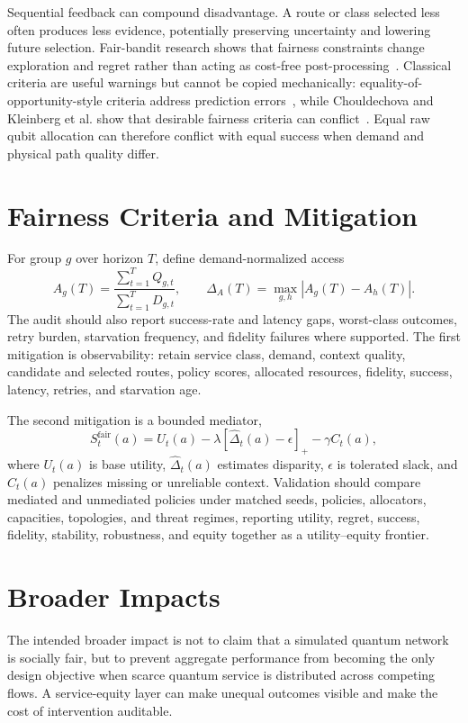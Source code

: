 \documentclass[10pt,conference]{IEEEtran}
\begin{document}
Sequential feedback can compound disadvantage. A route or class selected less often produces less evidence, potentially preserving uncertainty and lowering future selection. Fair-bandit research shows that fairness constraints change exploration and regret rather than acting as cost-free post-processing~\cite{joseph2016fairness,chen2020faircmab}. Classical criteria are useful warnings but cannot be copied mechanically: equality-of-opportunity-style criteria address prediction errors~\cite{hardt2016equality}, while Chouldechova and Kleinberg et al. show that desirable fairness criteria can conflict~\cite{chouldechova2017fair,kleinberg2017tradeoffs}. Equal raw qubit allocation can therefore conflict with equal success when demand and physical path quality differ.
\section{Fairness Criteria and Mitigation}
For group $g$ over horizon $T$, define demand-normalized access
\begin{equation}
A_g(T)=\frac{\sum_{t=1}^{T}Q_{g,t}}{\sum_{t=1}^{T}D_{g,t}},\qquad
\Delta_A(T)=\max_{g,h}|A_g(T)-A_h(T)|.
\end{equation}
The audit should also report success-rate and latency gaps, worst-class outcomes, retry burden, starvation frequency, and fidelity failures where supported. The first mitigation is observability: retain service class, demand, context quality, candidate and selected routes, policy scores, allocated resources, fidelity, success, latency, retries, and starvation age.

The second mitigation is a bounded mediator,
\begin{equation}
S_t^{\mathrm{fair}}(a)=U_t(a)-\lambda[\widehat{\Delta}_t(a)-\epsilon]_+-\gamma C_t(a),
\end{equation}
where $U_t(a)$ is base utility, $\widehat{\Delta}_t(a)$ estimates disparity, $\epsilon$ is tolerated slack, and $C_t(a)$ penalizes missing or unreliable context. Validation should compare mediated and unmediated policies under matched seeds, policies, allocators, capacities, topologies, and threat regimes, reporting utility, regret, success, fidelity, stability, robustness, and equity together as a utility--equity frontier.
\section{Broader Impacts}
The intended broader impact is not to claim that a simulated quantum network is socially fair, but to prevent aggregate performance from becoming the only design objective when scarce quantum service is distributed across competing flows. A service-equity layer can make unequal outcomes visible and make the cost of intervention auditable.
\end{document}
